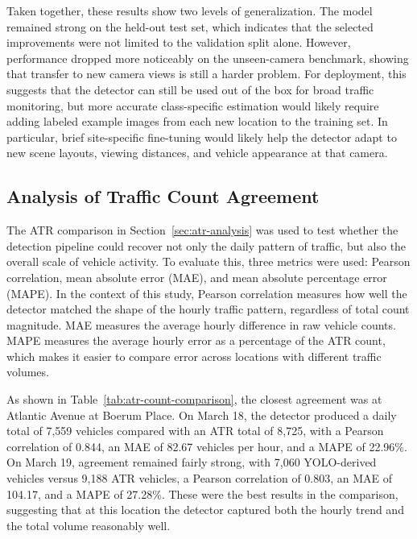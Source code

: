 Taken together, these results show two levels of generalization. The model remained 
strong on the held-out test set, which indicates that the selected improvements were 
not limited to the validation split alone. However, performance dropped more noticeably
on the unseen-camera benchmark, showing that transfer to new camera views is still 
a harder problem. For deployment, this suggests that the detector can still be used 
out of the box for broad traffic monitoring, but more accurate class-specific 
estimation would likely require adding labeled example images from each new location 
to the training set. In particular, brief site-specific fine-tuning would likely 
help the detector adapt to new scene layouts, viewing distances, and vehicle appearance 
at that camera.


\subsection{Analysis of Traffic Count Agreement}

The ATR comparison in Section~\ref{sec:atr-analysis} was used to test whether the 
detection pipeline could recover not only the daily pattern of traffic, but also 
the overall scale of vehicle activity. To evaluate this, three metrics were used: 
Pearson correlation, mean absolute error (MAE), and mean absolute percentage error 
(MAPE). In the context of this study, Pearson correlation measures how well the 
detector matched the shape of the hourly traffic pattern, regardless of total 
count magnitude. MAE measures the average hourly difference in raw vehicle counts. 
MAPE measures the average hourly error as a percentage of the ATR count, which 
makes it easier to compare error across locations with different traffic volumes.

As shown in Table~\ref{tab:atr-count-comparison}, the closest agreement was 
at Atlantic Avenue at Boerum Place. On March 18, the detector produced a daily 
total of 7,559 vehicles compared with an ATR total of 8,725, with a Pearson 
correlation of 0.844, an MAE of 82.67 vehicles per hour, and a MAPE of 22.96\%. 
On March 19, agreement remained fairly strong, with 7,060 YOLO-derived vehicles 
versus 9,188 ATR vehicles, a Pearson correlation of 0.803, an MAE of 104.17, and 
a MAPE of 27.28\%. These were the best results in the comparison, suggesting that
at this location the detector captured both the hourly trend and the total volume
reasonably well.

